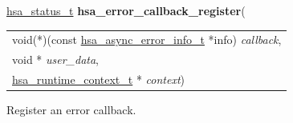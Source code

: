 \documentclass[final]{book}
\newcommand{\hsaarg}[1]{\textit{#1}}
\begin{document}
\begin{appendices}
\noindent\begin{tcolorbox}[breakable,nobeforeafter,colframe=white,colback=lightgray,left=0mm]
\hyperlink{group--status-1gad755322e7ff95456520e8abdbe90d225}{hsa_status_t} \hypertarget{group--status-1gafd8fb108ce9ca4862ef939c0477e1793}{\textbf{hsa_error_callback_register}}(
\vspace{-3.5mm}\begin{longtable}{@{}p{\textwidth}}
\hspace{1.7em}void(*)(const \hyperlink{group--status-1ga1e98022fc32cd651dc83c5f871e1a960}{hsa_async_error_info_t} *info) \hsaarg{callback},\\
\hspace{1.7em}void * \hsaarg{user_data},\\
\hspace{1.7em}\hyperlink{group--context-1ga0296b674c03f1a65fa8ef91e2f0ad44d}{hsa_runtime_context_t} * \hsaarg{context})\end{longtable}

\end{tcolorbox}
Register an error callback.


\end{appendices}
\end{document}
